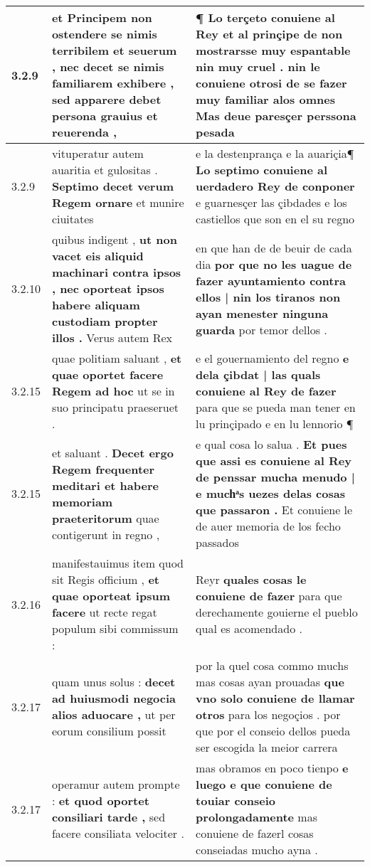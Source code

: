 \begin{tabular}{|p{1cm}|p{6.5cm}|p{6.5cm}|}
3.2.9 & et Principem non ostendere se nimis terribilem et seuerum , \textbf{ nec decet se nimis familiarem exhibere , } sed apparere debet persona grauius et reuerenda , & ¶ Lo terçeto conuiene al Rey et al prinçipe de non mostrarsse muy espantable nin muy cruel . \textbf{ nin le conuiene otrosi de se fazer muy familiar alos omnes } Mas deue paresçer perssona pesada \\\hline
3.2.9 & vituperatur autem auaritia et gulositas . \textbf{ Septimo decet verum Regem ornare } et munire ciuitates & e la destenprança e la auariçia¶ \textbf{ Lo septimo conuiene al uerdadero Rey de conponer } e guarnesçer las çibdades e los castiellos que son en el su regno \\\hline
3.2.10 & quibus indigent , \textbf{ ut non vacet eis aliquid machinari contra ipsos , nec oporteat ipsos habere aliquam custodiam propter illos . } Verus autem Rex & en que han de de beuir de cada dia \textbf{ por que no les uague de fazer ayuntamiento contra ellos | nin los tiranos non ayan menester ninguna guarda } por temor dellos . \\\hline
3.2.15 & quae politiam saluant , \textbf{ et quae oportet facere Regem ad hoc } ut se in suo principatu praeseruet . & e el gouernamiento del regno \textbf{ e dela çibdat | las quals conuiene al Rey de fazer } para que se pueda man tener en lu prinçipado e en lu lennorio ¶ \\\hline
3.2.15 & et saluant . \textbf{ Decet ergo Regem frequenter meditari et habere memoriam praeteritorum } quae contigerunt in regno , & e qual cosa lo salua . \textbf{ Et pues que assi es conuiene al Rey de penssar mucha menudo | e muchͣs uezes delas cosas que passaron . } Et conuiene le de auer memoria de los fecho passados \\\hline
3.2.16 & manifestauimus item quod sit Regis officium , \textbf{ et quae oporteat ipsum facere } ut recte regat populum sibi commissum : & Reyr \textbf{ quales cosas le conuiene de fazer } para que derechamente gouierne el pueblo qual es acomendado . \\\hline
3.2.17 & quam unus solus : \textbf{ decet ad huiusmodi negocia alios aduocare , } ut per eorum consilium possit & por la quel cosa commo muchs mas cosas ayan prouadas \textbf{ que vno solo conuiene de llamar otros } para los negoçios . por que por el conseio dellos pueda ser escogida la meior carrera \\\hline
3.2.17 & operamur autem prompte : \textbf{ et quod oportet consiliari tarde , } sed facere consiliata velociter . & mas obramos en poco tienpo \textbf{ e luego e que conuiene de touiar conseio prolongadamente } mas conuiene de fazerl cosas conseiadas mucho ayna . \\\hline

\end{tabular}

